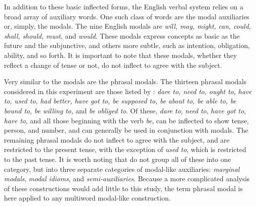 \documentclass[main.tex]{subfiles}
\begin{document}
In addition to these basic inflected forms, the English verbal system relies on a broad array of auxiliary words. One such class of words are the modal auxiliaries or, simply, the modals. The nine English modals are \textit{will, may, might, can, could, shall, should, must,} and \textit{would}. These modals express concepts as basic as the future and the subjunctive, and others more subtle, such as intention, obligation, ability, and so forth. It is important to note that these modals, whether they reflect a change of tense or not, do not inflect to agree with the subject. 

Very similar to the modals are the phrasal modals. The thirteen phrasal modals considered in this experiment are those listed by \citet[pp. 136-47]{quirk:1985}: \textit{dare to, need to, ought to, have to, used to, had better, have got to, be supposed to, be about to, be able to, be bound to, be willing to,} and \textit{be obliged to}. Of these, \textit{dare to}, \textit{need to}, \textit{have got to}, \textit{have to}, and all those beginning with the verb \textit{be}, can be inflected to show tense, person, and number, and can generally be used in conjunction with modals. The remaining phrasal modals do not inflect to agree with the subject, and are restricted to the present tense, with the exception of \textit{used to}, which is restricted to the past tense. It is worth noting that \citet{quirk:1985} do not group all of these into one category, but into three separate categories of modal-like auxiliaries: \textit{marginal modals}, \textit{modal idioms}, and \textit{semi-auxiliaries}. Because a more complicated analysis of these constructions would add little to this study, the term phrasal modal is here applied to any multiword modal-like construction.
\end{document}
